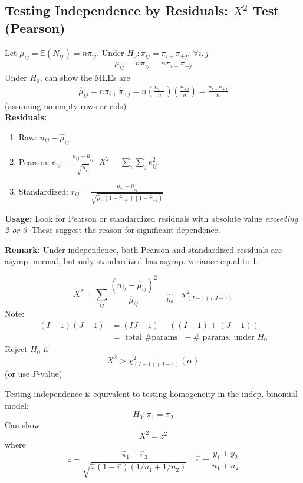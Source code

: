 \documentclass[11pt]{elegantbook}
\begin{document}
\subsection{Testing Independence by Residuals: $X^2$ Test (Pearson)}
Let $\mu_{ij}=\mathbb{E}(N_{ij})=n\pi_{ij}$. Under $H_0:\pi_{ij}=\pi_{i+}\pi_{+j},\ \forall i,j$
\begin{equation}
    \begin{aligned}
        \mu_{ij}=n\pi_{ij}=n\pi_{i+}\pi_{+j}
    \end{aligned}
    \nonumber
\end{equation}
Under $H_0$, can show the MLEs are
\begin{equation}
    \begin{aligned}
        \hat{\mu}_{ij}=n\hat{\pi}_{i+}\hat{\pi}_{+j}=n\left(\frac{n_{i+}}{n}\right)\left(\frac{n_{+j}}{n}\right)=\frac{n_{i+}n_{+j}}{n}
    \end{aligned}
    \nonumber
\end{equation}
(assuming no empty rows or cols)\\
\textbf{Residuals:}
\begin{enumerate}
    \item Raw: $n_{ij}-\hat{\mu}_{ij}$
    \item Pearson: $e_{ij}=\frac{n_{ij}-\hat{\mu}_{ij}}{\sqrt{\hat{\mu}_{ij}}}$. $X^2=\sum_i\sum_j e_{ij}^2$.
    \item Standardized: $r_{ij}=\frac{n_{ij}-\hat{\mu}_{ij}}{\sqrt{\hat{\mu}_{ij}(1-\hat{\pi}_{i+})(1-\hat{\pi}_{+j})}}$
\end{enumerate}
\textbf{Usage:} Look for Pearson or standardized residuals with absolute value \textit{exceeding 2 or 3}. These suggest the reason for significant dependence.

\textbf{Remark:} Under independence, both Pearson and standardized residuals are asymp. normal, but only standardized has asymp. variance equal to 1.

\begin{definition}
    \normalfont
    $$X^2=\sum_{i j} \frac{\left(n_{i j}-\hat{\mu}_{i j}\right)^2}{\hat{\mu}_{i j}} \quad \underset{H_0}{\dot{\sim}}\quad \chi_{(I-1)(J-1)}^2$$
    Note:
    $$
    \begin{aligned}
    (I-1)(J-1) & =(I J-1)-((I-1)+(J-1)) \\
    & =\text { total \# params. }-\# \text { params. under } H_0
    \end{aligned}
    $$
    Reject $H_0$ if
    $$
    X^2>\chi_{(I-1)(J-1)}^2(\alpha)
    $$
    (or use $P$-value)
\end{definition}
\begin{example}
    Testing independence is equivalent to testing homogeneity in the indep. binomial model:
    $$
    H_0: \pi_1=\pi_2
    $$
    Can show
    $$
    X^2=z^2
    $$
    where
    $$
    z=\frac{\hat{\pi}_1-\hat{\pi}_2}{\sqrt{\hat{\pi}(1-\hat{\pi})\left(1 / n_1+1 / n_2\right)}} \quad \hat{\pi}=\frac{y_1+y_2}{n_1+n_2}
    $$
\end{example}
\end{document}
